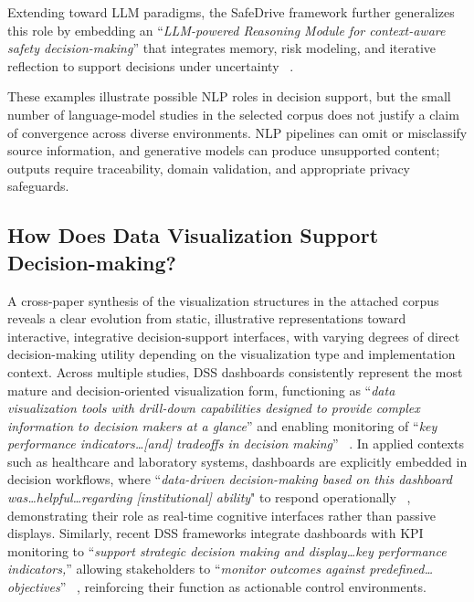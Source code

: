 \documentclass{sfuthesis}
\begin{document}
Extending toward LLM paradigms, the SafeDrive framework further generalizes this role by embedding an “\textit{LLM-powered Reasoning Module for context-aware safety decision-making}” that integrates memory, risk modeling, and iterative reflection to support decisions under uncertainty ~\cite{zhou2026safedrive}.\par
These examples illustrate possible NLP roles in decision support, but the small number of language-model studies in the selected corpus does not justify a claim of convergence across diverse environments. NLP pipelines can omit or misclassify source information, and generative models can produce unsupported content; outputs require traceability, domain validation, and appropriate privacy safeguards.

\subsection{How Does Data Visualization Support Decision-making?}
A cross-paper synthesis of the visualization structures in the attached corpus reveals a clear evolution from static, illustrative representations toward interactive, integrative decision-support interfaces, with varying degrees of direct decision-making utility depending on the visualization type and implementation context. Across multiple studies, DSS dashboards consistently represent the most mature and decision-oriented visualization form, functioning as “\textit{data visualization tools with drill-down capabilities designed to provide complex information to decision makers at a glance}” and enabling monitoring of “\textit{key performance indicators…[and] tradeoffs in decision making}” ~\cite{weiner_integrating_2015}. In applied contexts such as healthcare and laboratory systems, dashboards are explicitly embedded in decision workflows, where “\textit{data-driven decision-making based on this dashboard was…helpful…regarding [institutional] ability}" to respond operationally ~\cite{Dahl2022PathologyLaboratories}, demonstrating their role as real-time cognitive interfaces rather than passive displays. Similarly, recent DSS frameworks integrate dashboards with KPI monitoring to “\textit{support strategic decision making and display…key performance indicators,}” allowing stakeholders to “\textit{monitor outcomes against predefined…objectives}” ~\cite{DelaCal2026CulturalTourism}, reinforcing their function as actionable control environments.\par
\end{document}
